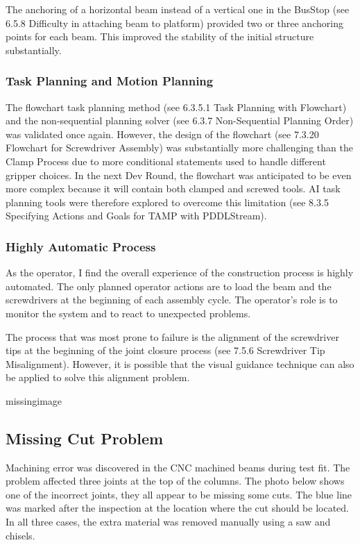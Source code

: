 The anchoring of a horizontal beam instead of a vertical one in the BusStop (see 6.5.8 Difficulty in attaching beam to platform) provided two or three anchoring points for each beam. This improved the stability of the initial structure substantially.

\subsubsection{Task Planning and Motion Planning}
The flowchart task planning method (see 6.3.5.1 Task Planning with Flowchart) and the non-sequential planning solver (see 6.3.7 Non-Sequential Planning Order) was validated once again. However, the design of the flowchart (see 7.3.20 Flowchart for Screwdriver Assembly) was substantially more challenging than the Clamp Process due to more conditional statements used to handle different gripper choices. 
In the next Dev Round, the flowchart was anticipated to be even more complex because it will contain both clamped and screwed tools. AI task planning tools were therefore explored to overcome this limitation (see 8.3.5 Specifying Actions and Goals for TAMP with PDDLStream). 

\subsubsection{Highly Automatic Process}
As the operator, I find the overall experience of the construction process is highly automated. The only planned operator actions are to load the beam and the screwdrivers at the beginning of each assembly cycle. The operator’s role is to monitor the system and to react to unexpected problems.

The process that was most prone to failure is the alignment of the screwdriver tips at the beginning of the joint closure process (see 7.5.6 Screwdriver Tip Misalignment). However, it is possible that the visual guidance technique can also be applied to solve this alignment problem. 

missingimage

\subsection{Missing Cut Problem}
Machining error was discovered in the CNC machined beams during test fit. The problem affected three joints at the top of the columns. The photo below shows one of the incorrect joints, they all appear to be missing some cuts. The blue line was marked after the inspection at the location where the cut should be located. In all three cases, the extra material was removed manually using a saw and chisels. 

